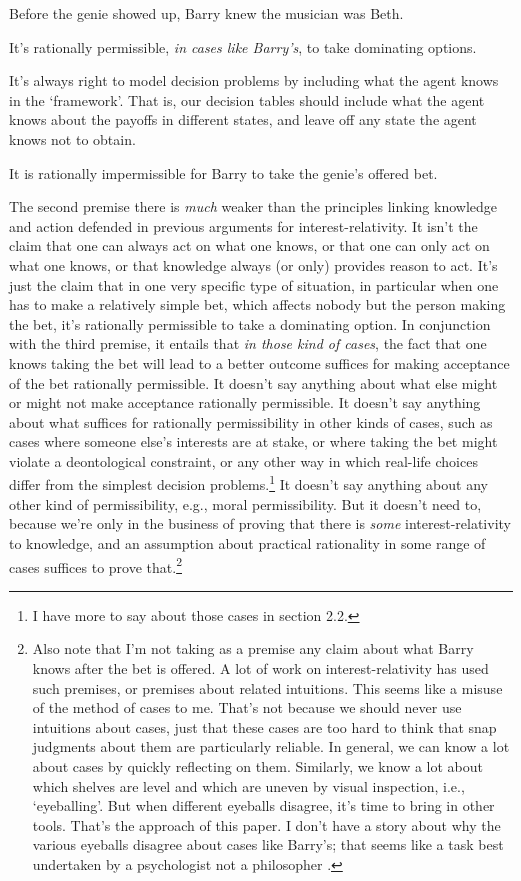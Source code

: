 \begin{enumerate*}
\item Before the genie showed up, Barry knew the musician was Beth.
\item It's rationally permissible, \textit{in cases like Barry's}, to take dominating options.
\item It's always right to model decision problems by including what the agent knows in the `framework'. That is, our decision tables should include what the agent knows about the payoffs in different states, and leave off any state the agent knows not to obtain.
\item It is rationally impermissible for Barry to take the genie's offered bet.
\end{enumerate*}

\noindent The second premise there is \textit{much} weaker than the principles linking knowledge and action defended in previous arguments for interest-relativity. It isn't the claim that one can always act on what one knows, or that one can only act on what one knows, or that knowledge always (or only) provides reason to act. It's just the claim that in one very specific type of situation, in particular when one has to make a relatively simple bet, which affects nobody but the person making the bet, it's rationally permissible to take a dominating option. In conjunction with the third premise, it entails that \textit{in those kind of cases}, the fact that one knows taking the bet will lead to a better outcome suffices for making acceptance of the bet rationally permissible. It doesn't say anything about what else might or might not make acceptance rationally permissible. It doesn't say anything about what suffices for rationally permissibility in other kinds of cases, such as cases where someone else's interests are at stake, or where taking the bet might violate a deontological constraint, or any other way in which real-life choices differ from the simplest decision problems.\footnote{I have more to say about those cases in section 2.2.} It doesn't say anything about any other kind of permissibility, e.g., moral permissibility. But it doesn't need to, because we're only in the business of proving that there is \textit{some} interest-relativity to knowledge, and an assumption about practical rationality in some range of cases suffices to prove that.\footnote{Also note that I'm not taking as a premise any claim about what Barry knows after the bet is offered. A lot of work on interest-relativity has used such premises, or premises about related intuitions. This seems like a misuse of the method of cases to me. That's not because we should never use intuitions about cases, just that these cases are too hard to think that snap judgments about them are particularly reliable. In general, we can know a lot about cases by quickly reflecting on them. Similarly, we know a lot about which shelves are level and which are uneven by visual inspection, i.e., `eyeballing'. But when different eyeballs disagree, it's time to bring in other tools. That's the approach of this paper. I don't have a story about why the various eyeballs disagree about cases like Barry's; that seems like a task best undertaken by a psychologist not a philosopher \citep{Ichikawa2009}.}

